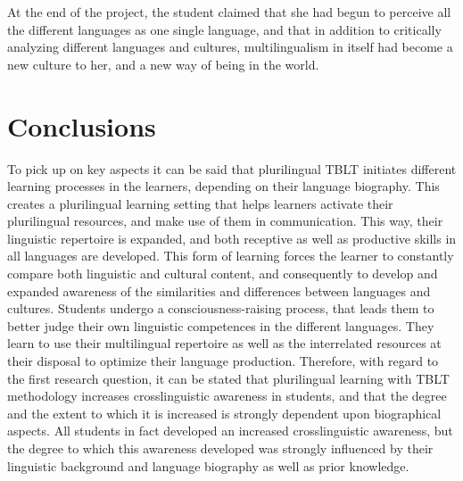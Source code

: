 \documentclass[output=paper]{../langscibook}
\begin{document}
At the end of the project, the student claimed that she had begun to perceive all the different languages as one single language, and that in addition to critically analyzing different languages and cultures, multilingualism in itself had become a new culture to her, and a new way of being in the world.

\section{Conclusions}


To pick up on key aspects it can be said that plurilingual TBLT initiates different learning processes in the learners, depending on their language biography. This creates a plurilingual learning setting that helps learners activate their plurilingual resources, and make use of them in communication. This way, their linguistic repertoire is expanded, and both receptive as well as productive skills in all languages are developed. This form of learning forces the learner to constantly compare both linguistic and cultural content, and consequently to develop and expanded awareness of the similarities and differences between languages and cultures. Students undergo a consciousness-raising process, that leads them to better judge their own linguistic competences in the different languages. They learn to use their multilingual repertoire as well as the interrelated resources at their disposal to optimize their language production. Therefore, with regard to the first research question, it can be stated that plurilingual learning with TBLT methodology increases crosslinguistic awareness in students, and that the degree and the extent to which it is increased is strongly dependent upon biographical aspects. All students in fact developed an increased crosslinguistic awareness, but the degree to which this awareness developed was strongly influenced by their linguistic background and language biography as well as prior knowledge. 
\end{document}
